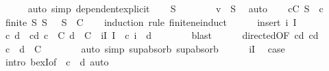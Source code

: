\begin{isabellebody}
\ \ \ \ \isamarkupfalse%
\ {\isacharparenleft}{\kern0pt}auto\ simp{\isacharcolon}{\kern0pt}\ dependent{\isacharunderscore}{\kern0pt}explicit{\isacharparenright}{\kern0pt}\isanewline
\isanewline
\ \ \isamarkupfalse%
\ {\isachardoublequoteopen}S\ {\isasymnoteq}\ {\isacharbraceleft}{\kern0pt}{\isacharbraceright}{\kern0pt}{\isachardoublequoteclose}\isanewline
\ \ \ \ \isamarkupfalse%
\ {\isacartoucheopen}v\ {\isasymin}\ S{\isacartoucheclose}\ \isamarkupfalse%
\ auto\isanewline
\ \ \isamarkupfalse%
\ {\isachardoublequoteopen}{\isasymexists}c{\isasymin}C{\isachardot}{\kern0pt}\ S\ {\isasymsubseteq}\ c{\isachardoublequoteclose}\isanewline
\ \ \ \ \isamarkupfalse%
\ {\isacartoucheopen}finite\ S{\isacartoucheclose}\ {\isacartoucheopen}S\ {\isasymnoteq}\ {\isacharbraceleft}{\kern0pt}{\isacharbraceright}{\kern0pt}{\isacartoucheclose}\ {\isacartoucheopen}S\ {\isasymsubseteq}\ {\isasymUnion}C{\isacartoucheclose}\isanewline
\ \ \isamarkupfalse%
\ {\isacharparenleft}{\kern0pt}induction\ rule{\isacharcolon}{\kern0pt}\ finite{\isacharunderscore}{\kern0pt}ne{\isacharunderscore}{\kern0pt}induct{\isacharparenright}{\kern0pt}\isanewline
\ \ \ \ \isamarkupfalse%
\ {\isacharparenleft}{\kern0pt}insert\ i\ I{\isacharparenright}{\kern0pt}\isanewline
\ \ \ \ \isamarkupfalse%
\ \isamarkupfalse%
\ c\ d\ \ cd{\isacharcolon}{\kern0pt}\ {\isachardoublequoteopen}c\ {\isasymin}\ C{\isachardoublequoteclose}\ {\isachardoublequoteopen}d\ {\isasymin}\ C{\isachardoublequoteclose}\ \ iI{\isacharcolon}{\kern0pt}\ {\isachardoublequoteopen}I\ {\isasymsubseteq}\ c{\isachardoublequoteclose}\ {\isachardoublequoteopen}i\ {\isasymin}\ d{\isachardoublequoteclose}\isanewline
\ \ \ \ \ \ \isamarkupfalse%
\ blast\isanewline
\ \ \ \ \isamarkupfalse%
\ directed{\isacharbrackleft}{\kern0pt}OF\ cd{\isacharbrackright}{\kern0pt}\ cd\ \isamarkupfalse%
\ {\isachardoublequoteopen}c\ {\isasymunion}\ d\ {\isasymin}\ C{\isachardoublequoteclose}\isanewline
\ \ \ \ \ \ \isamarkupfalse%
\ {\isacharparenleft}{\kern0pt}auto\ simp{\isacharcolon}{\kern0pt}\ sup{\isachardot}{\kern0pt}absorb{}\ sup{\isachardot}{\kern0pt}absorb{}{\isacharparenright}{\kern0pt}\isanewline
\ \ \ \ \isamarkupfalse%
\ iI\ \isamarkupfalse%
\ {\isacharquery}{\kern0pt}case\isanewline
\ \ \ \ \ \ \isamarkupfalse%
\ {\isacharparenleft}{\kern0pt}intro\ bexI{\isacharbrackleft}{\kern0pt}of\ {\isacharunderscore}{\kern0pt}\ {\isachardoublequoteopen}c\ {\isasymunion}\ d{\isachardoublequoteclose}{\isacharbrackright}{\kern0pt}{\isacharparenright}{\kern0pt}\ auto\isanewline

\end{isabellebody}
